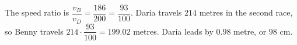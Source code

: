 The speed ratio is $\dfrac{v_B}{v_D}=\dfrac{186}{200}=\dfrac{93}{100}$. Daria travels $214$ metres in the second race, so Benny travels $214\cdot\dfrac{93}{100}=199.02$ metres. Daria leads by $0.98$ metre, or $\boxed{98\text{ cm}}$.

